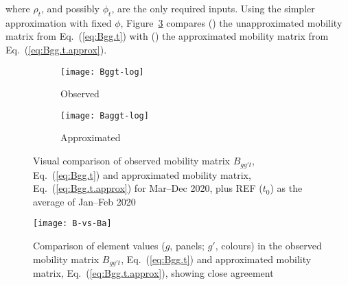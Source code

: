 where $\rho_{t}$, and possibly $\phi_{t}$, are the only required inputs.
Using the simpler approximation with fixed $\phi$, Figure~\ref{fig:Bggt}
compares () the unapproximated mobility matrix from Eq.~(\ref{eq:Bgg.t})
with () the approximated mobility matrix from Eq.~(\ref{eq:Bgg.t.approx}).
\begin{figure}[ht]
  \begin{subfigure}{\linewidth}
    \texttt{[image: Bggt-log]}
    \caption{Observed}
    \label{fig:Bggt-orig}
  \end{subfigure}
  \begin{subfigure}{\linewidth}
    \texttt{[image: Baggt-log]}
    \caption{Approximated}
    \label{fig:Bggt-approx}
  \end{subfigure}
  \caption{Visual comparison of
    observed mobility matrix $B_{gg't}$, Eq.~(\ref{eq:Bgg.t}) and
    approximated mobility matrix, Eq.~(\ref{eq:Bgg.t.approx})
    for Mar--Dec 2020, plus REF ($t_0$) as the average of Jan--Feb 2020}
  \label{fig:Bggt}
\end{figure}
\begin{figure}[ht]
  \centering
  \texttt{[image: B-vs-Ba]}
  \caption{Comparison of element values ($g$, panels; $g'$, colours) in the
    observed mobility matrix $B_{gg't}$, Eq.~(\ref{eq:Bgg.t}) and
    approximated mobility matrix, Eq.~(\ref{eq:Bgg.t.approx}),
    showing close agreement}
  \label{fig:B.vs.Ba}
\end{figure}
\clearpage
